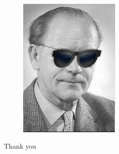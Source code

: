 \documentclass{beamer}
\begin{document}
\begin{frame}[plain]
	\begin{figure}
		\centering
		\includegraphics[width=0.5\linewidth]{raschJ}
	\end{figure}
	
	
	\begin{center}
\Huge

\textcolor{template}{Thank you}
	\end{center}
\end{frame}
\end{document}

